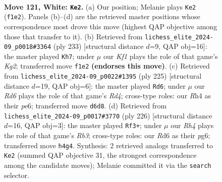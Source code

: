 \documentclass[11pt]{article}
\begin{document}
\clearpage

\begin{figure}[p]\centering
\begin{subfigure}{0.46\textwidth}\centering
\resizebox{\linewidth}{!}{%
\newchessgame
\chessboard[
  setfen={1k2r3/8/3Rp3/4P3/5P1R/8/8/5K2 w - - 27 121},
  showmover=false,
  pgfstyle=straightmove, color=movearrow, markmove={f1-e2}
]}
\caption{}
\end{subfigure}\hfill
\begin{subfigure}{0.46\textwidth}\centering
\resizebox{\linewidth}{!}{%
\newchessgame
\chessboard[
  setfen={8/6k1/6p1/7p/5r1P/8/4K2R/8 b - - 95 117},
  showmover=false,
  pgfstyle=straightmove, color=movearrow, markmove={g7-h7}
]}
\caption{}
\end{subfigure}
\\[4pt]
\begin{subfigure}{0.46\textwidth}\centering
\resizebox{\linewidth}{!}{%
\newchessgame
\chessboard[
  setfen={8/4k1p1/1KR1P2p/3r3P/8/8/8/8 b - - 2 113},
  showmover=false,
  pgfstyle=straightmove, color=movearrow, markmove={d5-d6}
]}
\caption{}
\end{subfigure}\hfill
\begin{subfigure}{0.46\textwidth}\centering
\resizebox{\linewidth}{!}{%
\newchessgame
\chessboard[
  setfen={8/r4k2/6p1/7p/7P/1R4P1/8/6K1 w - - 64 114},
  showmover=false,
  pgfstyle=straightmove, color=movearrow, markmove={b3-f3}
]}
\caption{}
\end{subfigure}
\caption{\textbf{Move 121, White: \texttt{Ke2}.} (a) Our position; Melanie plays \texttt{Ke2} (\texttt{f1e2}). Panels (b)--(d) are the retrieved master positions whose correspondence most drove this move (highest QAP objective among those that transfer to it). (b) Retrieved from \texttt{lichess\_elite\_2024-09\_p0018\#3364} (ply 233) [structural distance $d$=9, QAP obj=16]: the master played \texttt{Kh7}; under $\mu$ our \emph{Kf1} plays the role of that game's \emph{Kg2}; transferred move \texttt{f1e2} \textbf{(endorses this move)}. (c) Retrieved from \texttt{lichess\_elite\_2024-09\_p0022\#1395} (ply 225) [structural distance $d$=19, QAP obj=6]: the master played \texttt{Rd6}; under $\mu$ our \emph{Rd6} plays the role of that game's \emph{Rd4}; cross-type roles: our \emph{R}h4 as their \emph{p}e6; transferred move \texttt{d6d8}. (d) Retrieved from \texttt{lichess\_elite\_2024-09\_p0017\#3770} (ply 226) [structural distance $d$=16, QAP obj=3]: the master played \texttt{Rf3+}; under $\mu$ our \emph{Rh4} plays the role of that game's \emph{Rb3}; cross-type roles: our \emph{R}d6 as their \emph{p}g6; transferred move \texttt{h4g4}. Synthesis: 2 retrieved analogs transferred to \texttt{Ke2} (summed QAP objective 31, the strongest correspondence among the candidate moves); Melanie committed it via the \texttt{search} selector.}
\label{fig:thought-m240}
\end{figure}
\end{document}
